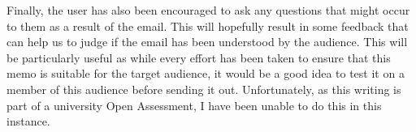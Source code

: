 \documentclass{article}
\begin{document}
Finally, the user has also been encouraged to ask any questions that might occur to them as a result of the email. This will hopefully result in some feedback that can help us to judge if the email has been understood by the audience.
This will be particularly useful as while every effort has been taken to ensure that this memo is suitable for the target audience, it would be a good idea to test it on a member of this audience before sending it out. Unfortunately, as this writing is part of a university Open Assessment, I have been unable to do this in this instance.

\newpage
\raggedright
{}

\end{document}
